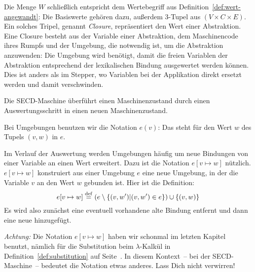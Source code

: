 Die Menge $W$ schließlich entspricht dem Wertebegriff aus
Definition~\ref{def:wert-angewandt}: Die Basiswerte gehören dazu,
außerdem 3-Tupel aus $(V\times C\times E)$.  Ein solches Tripel,
genannt \textit{Closure}, repräsentiert den Wert
einer Abstraktion.  Eine Closure besteht aus der Variable einer Abstraktion,
dem Maschinencode ihres Rumpfs und der Umgebung, die notwendig ist, um
die Abstraktion anzuwenden: Die Umgebung wird benötigt, damit die
freien Variablen der Abstraktion entsprechend der lexikalischen
Bindung ausgewertet werden können.  Dies
ist anders als im Stepper, wo Variablen bei der
Applikation direkt ersetzt werden und damit verschwinden.

Die SECD-Maschine überführt einen Maschinenzustand durch einen
Auswertungsschritt in einen neuen Maschinenzustand.

Bei Umgebungen benutzen wir die Notation $e(v)$: Das steht für den Wert
$w$ des Tupels $(v, w)$ in $e$.

Im Verlauf der Auswertung werden Umgebungen häufig um neue Bindungen
von einer Variable an einen Wert erweitert.  Dazu ist die Notation
$e[v\mapsto w]$ nützlich.  $e[v\mapsto w]$ konstruiert aus einer
Umgebung $e$ eine neue Umgebung, in der die Variable $v$ an den Wert
$w$ gebunden ist.  Hier ist die Definition:
%
\begin{displaymath}
  e[v\mapsto w] \stackrel{\rm def}{=} (e \setminus \{ (v, w') | (v, w') \in e \}) \cup \{
    (v, w) \}
\end{displaymath}
%
Es wird also zunächst eine eventuell vorhandene alte Bindung entfernt
und dann eine neue hinzugefügt.

\emph{Achtung:} Die Notation $e[v\mapsto w]$ haben wir schonmal im
letzten Kapitel benutzt, nämlich für die Substitution beim
$\lambda$-Kalkül in Definition~\ref{def:substitution} auf
Seite~\pageref{def:substitution}.  In diesem Kontext~-- bei der
SECD-Maschine~-- bedeutet die Notation etwas anderes.  Lass Dich nicht
verwirren!

